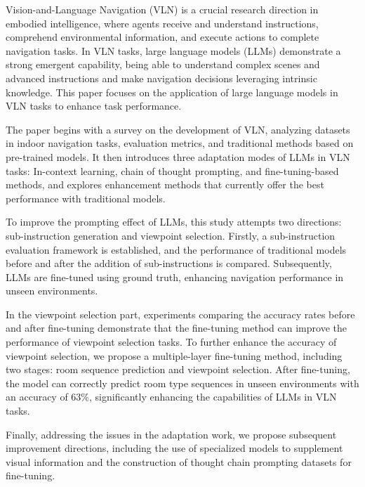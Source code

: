 \documentclass[bachelor]{thesis-uestc}
\begin{document}
\begin{englishabstract}
Vision-and-Language Navigation (VLN) is a crucial research direction in embodied intelligence, where agents receive and understand instructions, comprehend environmental information, and execute actions to complete navigation tasks. In VLN tasks, large language models (LLMs) demonstrate a strong emergent capability, being able to understand complex scenes and advanced instructions and make navigation decisions leveraging intrinsic knowledge. This paper focuses on the application of large language models in VLN tasks to enhance task performance.

The paper begins with a survey on the development of VLN, analyzing datasets in indoor navigation tasks, evaluation metrics, and traditional methods based on pre-trained models. It then introduces three adaptation modes of LLMs in VLN tasks: In-context learning, chain of thought prompting, and fine-tuning-based methods, and explores enhancement methods that currently offer the best performance with traditional models.

To improve the prompting effect of LLMs, this study attempts two directions: sub-instruction generation and viewpoint selection. Firstly, a sub-instruction evaluation framework is established, and the performance of traditional models before and after the addition of sub-instructions is compared. Subsequently, LLMs are fine-tuned using ground truth, enhancing navigation performance in unseen environments.

In the viewpoint selection part, experiments comparing the accuracy rates before and after fine-tuning demonstrate that the fine-tuning method can improve the performance of viewpoint selection tasks. To further enhance the accuracy of viewpoint selection, we propose a multiple-layer fine-tuning method, including two stages: room sequence prediction and viewpoint selection. After fine-tuning, the model can correctly predict room type sequences in unseen environments with an accuracy of 63\%, significantly enhancing the capabilities of LLMs in VLN tasks.

Finally, addressing the issues in the adaptation work, we propose subsequent improvement directions, including the use of specialized models to supplement visual information and the construction of thought chain prompting datasets for fine-tuning.

\end{englishabstract}
\end{document}
